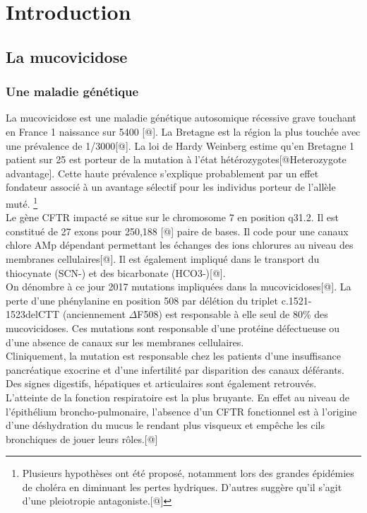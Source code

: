 \documentclass[12pt,a4paper]{article}
\begin{document}
\newpage

\setcounter{page}{1}

\section{Introduction}
\subsection{La mucovicidose}
\subsubsection{Une maladie génétique}
La mucovicidose est une maladie génétique autosomique récessive grave touchant en France 1 naissance sur 5400 [@]. La Bretagne est la région la plus touchée avec une prévalence de 1/3000[@].
La loi de Hardy Weinberg estime qu’en Bretagne 1 patient sur 25 est porteur de la mutation à l’état hétérozygotes[@Heterozygote advantage]. Cette haute prévalence s’explique probablement par un effet fondateur associé à un avantage sélectif pour les individus porteur de l’allèle muté. \footnote{Plusieurs hypothèses ont été proposé, notamment lors des grandes épidémies de choléra en diminuant les pertes hydriques. D’autres suggère qu'il s'agit d'une pleiotropie antagoniste.[@]} \\
Le gène CFTR impacté se situe sur le chromosome 7 en position q31.2. Il est constitué de 27 exons pour 250,188 [@] paire de bases. Il code pour une canaux chlore AMp dépendant permettant les échanges des ions chlorures au niveau des membranes cellulaires[@]. Il est également impliqué dans le transport du thiocynate (SCN-) et des bicarbonate (HCO3-)[@]. \\
On dénombre à ce jour 2017 mutations impliquées dans la mucovicidoses[@]. La perte d’une phénylanine en position 508 par délétion du triplet c.1521-1523delCTT (anciennement $\Delta$F508) est responsable à elle seul de 80\% des mucovicidoses.
Ces mutations sont responsable d’une protéine défectueuse ou d’une absence de canaux sur les membranes cellulaires. \\
Cliniquement, la mutation est responsable chez les patients d’une insuffisance pancréatique exocrine et d’une infertilité par disparition des canaux déférants. Des signes digestifs, hépatiques et articulaires sont également retrouvés.
L'atteinte de la fonction respiratoire est la plus bruyante. En effet au niveau de l’épithélium broncho-pulmonaire, l’absence d’un CFTR fonctionnel est à l’origine d’une déshydration du mucus le rendant plus visqueux et empêche les cils bronchiques de jouer leurs rôles.[@]\\
\end{document}
